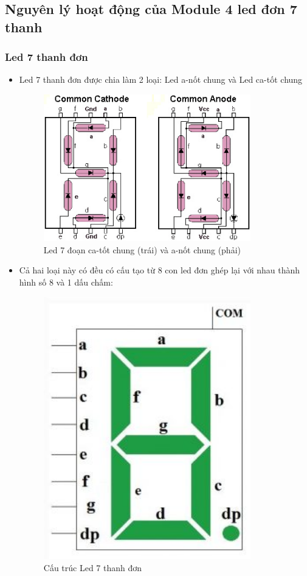 \documentclass[../report.tex]{subfiles}
\begin{document}
\subsection{Nguyên lý hoạt động của Module 4 led đơn  7 thanh}
\subsubsection{Led 7 thanh đơn}
\begin{itemize}
    \item Led 7 thanh đơn được chia làm 2 loại: Led a-nốt chung và Led ca-tốt chung
    \begin{figure}[H]
        \centering
        \includegraphics[width=9cm]{figures/led7.jpg}
        \caption{Led 7 đoạn ca-tốt chung (trái) và a-nốt chung (phải)}
    \end{figure} 
    
    \item Cả hai loại này có đều có cấu tạo từ 8 con led đơn ghép lại với nhau thành hình số 8 và 1 dấu chấm:
    \begin{figure}[H]
        \centering
        \includegraphics[width=9cm]{figures/ledS.jpg}
        \caption{Cấu trúc Led 7 thanh đơn}
    \end{figure} 


\end{itemize}
\end{document}
